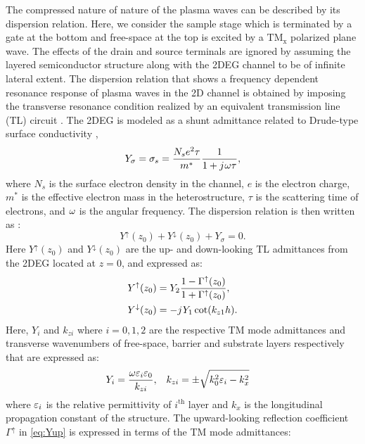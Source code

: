 \documentclass[11pt]{article}
\begin{document}
The compressed nature of nature of the plasma waves can be described by its dispersion relation. Here, we consider the sample stage which is terminated by a gate at the bottom and free-space at the top is excited by a $\mathrm{TM_x}$ polarized plane wave. The effects of the drain and source terminals are ignored by assuming the layered semiconductor structure along with the 2DEG channel to be of infinite lateral extent. The dispersion relation that shows a frequency dependent resonance response of plasma waves in the 2D channel is obtained by imposing the transverse resonance condition realized by an equivalent transmission line (TL) circuit \cite{Kastner_1988,Michalski2005}. The 2DEG is modeled as a shunt admittance related to Drude-type surface conductivity \cite{Burke2000},
%
\begin{equation}
  Y_{\sigma} = \sigma_s = \frac{N_s e^2 \tau}{m^{\ast}}\frac{1}{1 + j\mkern1mu \omega \tau},
  \label{eq:Y2deg}
\end{equation}
%
where $N_s$ is the surface electron density in the channel, $e$ is the electron charge, $m^{\ast}$ is the effective electron mass in the heterostructure, $\tau$ is the scattering time of electrons, and $\omega$ is the angular frequency. The dispersion relation is then written as \cite{Gomez-Diaz2012}:
%
\begin{equation}
  Y^{\uparrow}(z_0) + Y^{\downarrow}(z_0) + Y_{\sigma} = 0.
  \label{eq:dispersion}
\end{equation}
%
Here $Y^{\uparrow}(z_0)$ and $Y^{\downarrow}(z_0)$ are the up- and down-looking TL admittances from the 2DEG located at $z = 0$, and expressed as:
%
\begin{subequations}
  \begin{align}
    Y^{\uparrow}(z_0) &=  Y_2 \frac{1 - \Gamma^{\uparrow}(z_0)}{1 + \Gamma^{\uparrow}(z_0)},
    \label{eq:Yup} \\
    Y^{\downarrow}(z_0) &=  -j\mkern1mu Y_1 \cot (k_{z1} h).
    \label{eq:Ydown}
  \end{align}
  \label{eq:Y}
\end{subequations}
%
Here, $Y_{i}$ and $k_{zi}$ where $i = 0,1,2$ are the respective TM mode admittances and transverse wavenumbers of free-space, barrier and substrate layers respectively that are expressed as:
%
\begin{align}
  & Y_i = \frac{\omega \varepsilon_i \varepsilon_0}{k_{zi}}, && k_{zi} = \pm \sqrt{k_0^2 \varepsilon_i - k_x^2}
  \label{eq:Yandk}
\end{align}
%
where $\varepsilon_i$ is the relative permittivity of $i^{\text{th}}$ layer and $k_x$ is the longitudinal propagation constant of the structure. The upward-looking reflection coefficient $\Gamma^{\uparrow}$ in \eqref{eq:Yup} is expressed in terms of the TM mode admittances:
\end{document}
